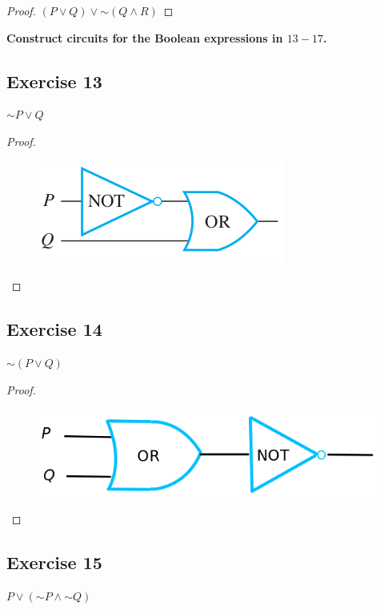 \documentclass[14pt]{extarticle}
\begin{document}
\begin{proof}
$(P \vee Q) \vee {\sim (Q \wedge R)}$
\end{proof}

{\bf \color{cyan} Construct circuits for the Boolean expressions in $13-17$.}

\subsection{Exercise 13}
${\sim P} \vee Q$

\begin{proof}
\begin{figure}[ht!]
\centering
\includegraphics[scale=0.5]{../images/2.4.13.png}
\end{figure}
\end{proof}

\subsection{Exercise 14}
${\sim(P \vee Q)}$

\begin{proof}
\begin{figure}[ht!]
\centering
\includegraphics[scale=0.3]{../images/2.4.14.png}
\end{figure}
\end{proof}

\subsection{Exercise 15}
$P \vee ({\sim P} \wedge {\sim Q})$
\end{document}
